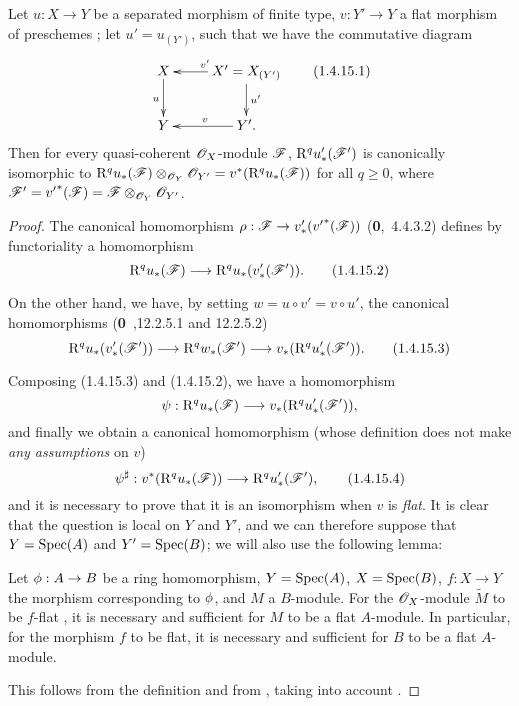 \begin{proposition}[1.4.15]
\label{III.1.4.15}
Let $u:X\to Y$ be a separated morphism of finite type, $v:Y'\to Y$ a flat morphism of preschemes ; let $u'=u_{(Y')}$, such that we have the commutative diagram
\[
  \xymatrix{
    X\ar[d]_u &
    X'=X_{(Y')}\ar[l]_{v'}\ar[d]^{u'}\\
    Y &
    Y'\ar[l]_{v}.
  }
  \tag{1.4.15.1}
\]
Then for every quasi-coherent $\mathscr{O}_X$-module $\mathscr{F}$, $\mathrm{R}^q u_*'(\mathscr{F}')$ is canonically isomorphic to $\mathrm{R}^q u_*(\mathscr{F})\otimes_{\mathscr{O}_Y}\mathscr{O}_{Y'}=v^*(\mathrm{R}^q u_*(\mathscr{F}))$ for all $q\geq 0$, where $\mathscr{F}'={v'}^*(\mathscr{F})=\mathscr{F}\otimes_{\mathscr{O}_Y}\mathscr{O}_{Y'}$.
\end{proposition}

\begin{proof}
The canonical homomorphism $\rho:\sh{F}\to v_*'({v'}^*(\sh{F}))$ (\textbf{0},~4.4.3.2) defines by functoriality a homomorphism
\[
  \RR^q u_*(\sh{F})\to\RR^q u_*(v_*'(\sh{F}')).
  \tag{1.4.15.2}
\]

On the other hand, we have, by setting $w=u\circ v'=v\circ u'$, the canonical homomorphisms (\textbf{0}~,12.2.5.1 and 12.2.5.2)
\[
  \RR^q u_*(v_*'(\sh{F}'))\to\RR^q w_*(\sh{F}')\to v_*(\RR^q u_*'(\sh{F}')).
  \tag{1.4.15.3}
\]

Composing (1.4.15.3) and (1.4.15.2), we have a homomorphism
\[
  \psi:\RR^q u_*(\sh{F})\to v_*(\RR^q u_*'(\sh{F}')),
\]
and finally we obtain a canonical homomorphism (whose definition does not make \emph{any assumptions} on $v$)
\[
  \psi^\sharp:v^*(\RR^q u_*(\sh{F}))\to\RR^q u_*'(\sh{F}'),
  \tag{1.4.15.4}
\]
and it is necessary to prove that it is an isomorphism when $v$ is \emph{flat}.
It is clear that the question is local on $Y$ and $Y'$, and we can therefore suppose that $Y=\operatorname{Spec}(A)$ and $Y'=\operatorname{Spec}(B)$; we will also use the following lemma:
\begin{lemma}[1.4.15.5]
\label{III.1.4.15.5}
Let $\vphi:A\to B$ be a ring homomorphism, $Y=\operatorname{Spec}(A)$, $X=\operatorname{Spec}(B)$, $f:X\to Y$ the morphism corresponding to $\phi$, and $M$ a $B$-module.
For the $\mathscr{O}_X$-module $\widetilde{M}$ to be $f$-flat , it is necessary and sufficient for $M$ to be a flat $A$-module.
In particular, for the morphism $f$ to be flat, it is necessary and sufficient for $B$ to be a flat $A$-module.
\end{lemma}

This follows from the definition  and from , taking into account .


\end{proof}
